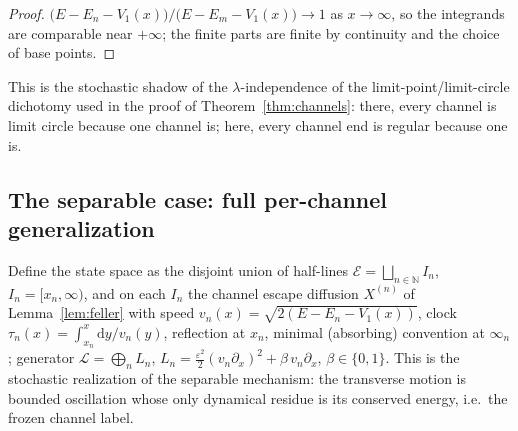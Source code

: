 \documentclass[11pt]{article}
\theoremstyle{definition}
\theoremstyle{remark}
\newcommand{\dd}{\mathrm{d}}
\begin{document}
\begin{proof}
$\bigl(E-E_{n}-V_{1}(x)\bigr)/\bigl(E-E_{m}-V_{1}(x)\bigr)\to1$ as
$x\to\infty$, so the integrands are comparable near $+\infty$; the
finite parts are finite by continuity and the choice of base points.
\end{proof}

This is the stochastic shadow of the $\lambda$-independence of the
limit-point/limit-circle dichotomy used in the proof of
Theorem~\ref{thm:channels}: there, every channel is limit circle
because one channel is; here, every channel end is regular because one
is.

\subsection{The separable case: full per-channel generalization}
\label{app:multiD-separable}

Define the state space as the disjoint union of half-lines
$\mathcal E=\bigsqcup_{n\in\mathbb N} I_{n}$, $I_{n}=[x_{n},\infty)$,
and on each $I_{n}$ the channel escape diffusion $X^{(n)}$ of
Lemma~\ref{lem:feller} with speed
$v_{n}(x)=\sqrt{2(E-E_{n}-V_{1}(x))}$, clock
$\tau_{n}(x)=\int_{x_{n}}^{x}\dd y/v_{n}(y)$, reflection at $x_{n}$,
minimal (absorbing) convention at $\infty_{n}$; generator
$\mathcal L=\bigoplus_{n}L_{n}$,
$L_{n}=\tfrac{\varepsilon^{2}}{2}(v_{n}\partial_{x})^{2}
+\beta\,v_{n}\partial_{x}$, $\beta\in\{0,1\}$. This is the stochastic
realization of the separable mechanism: the transverse motion is
bounded oscillation whose only dynamical residue is its conserved
energy, i.e.\ the frozen channel label.
\end{document}

